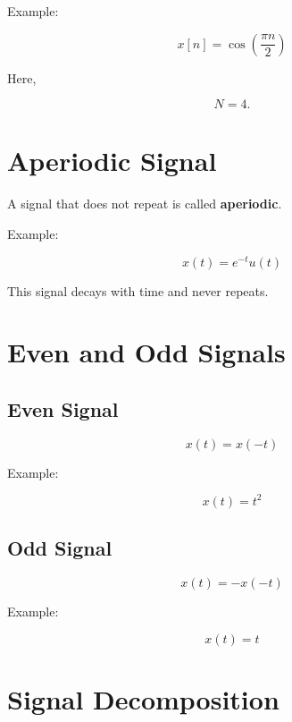 Example:

\[
x[n]=\cos\left(\frac{\pi n}{2}\right)
\]

Here,

\[
N=4.
\]


\section{Aperiodic Signal}

A signal that does not repeat is called \textbf{aperiodic}.

Example:

\[
x(t)=e^{-t}u(t)
\]

This signal decays with time and never repeats.


\section{Even and Odd Signals}


\subsection{Even Signal}

\[
\boxed{
x(t)=x(-t)
}
\]

Example:

\[
x(t)=t^2
\]


\subsection{Odd Signal}

\[
\boxed{
x(t)=-x(-t)
}
\]

Example:

\[
x(t)=t
\]


\section{Signal Decomposition}

